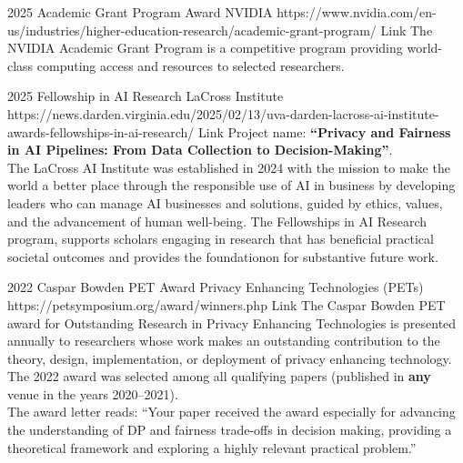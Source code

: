 \documentclass[localFont,alternative]{documentMETADATA}
\begin{document}

\begin{awards}
	\awardentryD
	{2025}
	{Academic Grant Program Award}
	{NVIDIA}
	{https://www.nvidia.com/en-us/industries/higher-education-research/academic-grant-program/}
	{Link}
	{The NVIDIA Academic Grant Program is a competitive program providing world-class computing access and resources to selected researchers.}

	\awardentryD
	{2025}
	{Fellowship in AI Research}
	{LaCross Institute}%
	{https://news.darden.virginia.edu/2025/02/13/uva-darden-lacross-ai-institute-awards-fellowships-in-ai-research/}
	{Link}
	{Project name: \textbf{``Privacy and Fairness in AI Pipelines: From Data Collection to Decision-Making''}.\\
	The LaCross AI Institute was established in 2024 with the mission to make the 
	world a better place through the responsible use of AI in business by developing 
	leaders who can manage AI businesses and solutions, guided by ethics, values, and 
	the advancement of human well-being. 
	The Fellowships in AI Research program, supports scholars engaging in research that 
	has beneficial practical societal outcomes  and  provides the foundationon for substantive future work.
	}

	\awardentryD
	{2022}
	{Caspar Bowden PET Award}%
	{Privacy Enhancing Technologies (PETs)}
	{https://petsymposium.org/award/winners.php}
	{Link}
	{The Caspar Bowden PET award for Outstanding Research in Privacy Enhancing Technologies is presented annually to researchers 
	whose work makes an outstanding contribution to the theory, design, implementation, or deployment of privacy enhancing technology. The 2022 award was selected among all qualifying papers (published in \textbf{any} venue in the years 2020--2021).\\
	The award letter reads: ``Your paper  received the award especially for advancing the understanding of DP and fairness trade-offs in decision making, providing a theoretical framework and exploring a highly relevant practical problem.''}


\end{awards}
\end{document}
